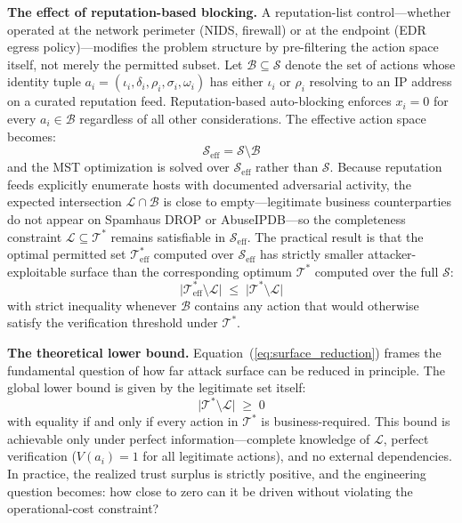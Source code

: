 \documentclass[acmlarge]{acmart}
\begin{document}
\textbf{The effect of reputation-based blocking.} A reputation-list control---whether
operated at the network perimeter (NIDS, firewall) or at the endpoint (EDR egress
policy)---modifies the problem structure by pre-filtering the action space itself,
not merely the permitted subset. Let $\mathcal{B} \subseteq \mathcal{S}$ denote the
set of actions whose identity tuple $a_i = (\iota_i, \delta_i, \rho_i, \sigma_i,
\omega_i)$ has either $\iota_i$ or $\rho_i$ resolving to an IP address on a curated
reputation feed. Reputation-based auto-blocking enforces $x_i = 0$ for every
$a_i \in \mathcal{B}$ regardless of all other considerations. The effective action
space becomes:
\begin{equation}
\mathcal{S}_{\text{eff}} = \mathcal{S} \setminus \mathcal{B}
\label{eq:s_effective}
\end{equation}
and the MST optimization is solved over $\mathcal{S}_{\text{eff}}$ rather than
$\mathcal{S}$. Because reputation feeds explicitly enumerate hosts with documented
adversarial activity, the expected intersection
$\mathcal{L} \cap \mathcal{B}$ is close to empty---legitimate business counterparties
do not appear on Spamhaus DROP or AbuseIPDB---so the completeness constraint
$\mathcal{L} \subseteq \mathcal{T}^{*}$ remains satisfiable in $\mathcal{S}_{\text{eff}}$.
The practical result is that the optimal permitted set $\mathcal{T}^{*}_{\text{eff}}$
computed over $\mathcal{S}_{\text{eff}}$ has strictly smaller attacker-exploitable
surface than the corresponding optimum $\mathcal{T}^{*}$ computed over the full
$\mathcal{S}$:
\begin{equation}
\bigl|\mathcal{T}^{*}_{\text{eff}} \setminus \mathcal{L}\bigr|
\;\leq\;
\bigl|\mathcal{T}^{*} \setminus \mathcal{L}\bigr|
\label{eq:surface_reduction}
\end{equation}
with strict inequality whenever $\mathcal{B}$ contains any action that would otherwise
satisfy the verification threshold under $\mathcal{T}^{*}$.

\textbf{The theoretical lower bound.} Equation~(\ref{eq:surface_reduction}) frames
the fundamental question of how far attack surface can be reduced in principle. The
global lower bound is given by the legitimate set itself:
\begin{equation}
\bigl|\mathcal{T}^{*} \setminus \mathcal{L}\bigr| \;\geq\; 0
\label{eq:global_bound}
\end{equation}
with equality if and only if every action in $\mathcal{T}^{*}$ is business-required.
This bound is achievable only under perfect information---complete knowledge of
$\mathcal{L}$, perfect verification ($V(a_i) = 1$ for all legitimate actions), and
no external dependencies. In practice, the realized trust surplus is strictly
positive, and the engineering question becomes: how close to zero can it be driven
without violating the operational-cost constraint?
\end{document}
